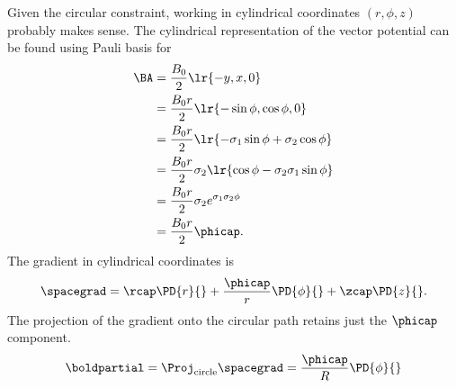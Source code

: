 %
%
Given the circular constraint, working in cylindrical coordinates \( ( r, \phi, z ) \) probably makes sense.  The cylindrical representation of the vector potential can be found using Pauli basis for 
%
\begin{equation}\label{eqn:gradQuantumProblemSet3Problem2:40}
\begin{aligned}
\BA
&= \frac{B_0}{2} \lr{ -y, x, 0 }
\\ &= \frac{B_0 r}{2} \lr{ -\sin\phi, \cos\phi, 0 }
\\ &= \frac{B_0 r}{2} \lr{ - \sigma_1 \sin\phi + \sigma_2 \cos\phi }
\\ &= \frac{B_0 r}{2} \sigma_2 \lr{ \cos\phi - \sigma_2 \sigma_1 \sin\phi }
\\ &= \frac{B_0 r}{2} \sigma_2 e^{ \sigma_1 \sigma_2 \phi}
\\ &= \frac{B_0 r}{2} \phicap.
\end{aligned}
\end{equation}
%
The gradient in cylindrical coordinates is
%
\begin{equation}\label{eqn:gradQuantumProblemSet3Problem2:60}
\spacegrad = \rcap \PD{r}{} + \frac{\phicap}{r} \PD{\phi}{} + \zcap \PD{z}{}.
\end{equation}
%
The projection of the gradient onto the circular path retains just the \( \phicap \) component.
%
\begin{equation}\label{eqn:gradQuantumProblemSet3Problem2:120}
\boldpartial = \Proj_{\textrm{circle}} \spacegrad = \frac{\phicap}{R} \PD{\phi}{}
\end{equation}

